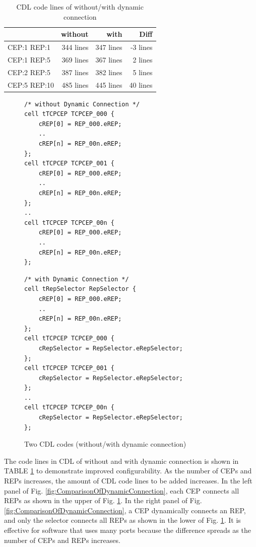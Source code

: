 \documentclass[conference]{IEEEtran/IEEEtran}
\begin{document}
\begin{table}[t]
    \centering
    \vspace{-1mm} \caption{CDL code lines of without/with dynamic connection}
    \begin{tabular}{l|r|r|r}
        \hline\hline
                     &  without  &  with  &  Diff  \\ \hline
        CEP:1 REP:1  &  344 lines     &  347 lines  &  -3 lines   \\
        CEP:1 REP:5  &  369 lines     &  367 lines  &   2 lines   \\
        CEP:2 REP:5  &  387 lines     &  382 lines  &   5 lines   \\
        CEP:5 REP:10 &  485 lines     &  445 lines  &  40 lines   \\
        \hline
    \end{tabular}
    \label{tab:EvaluationOfConfigurabilityByDynamicConnection}
\end{table}

\begin{figure}[t]
 \centering
 \begin{lstlisting}
/* without Dynamic Connection */
cell tTCPCEP TCPCEP_000 {
    cREP[0] = REP_000.eREP;
    ..
    cREP[n] = REP_00n.eREP;
};
cell tTCPCEP TCPCEP_001 {
    cREP[0] = REP_000.eREP;
    ..
    cREP[n] = REP_00n.eREP;
};
..
cell tTCPCEP TCPCEP_00n {
    cREP[0] = REP_000.eREP;
    ..
    cREP[n] = REP_00n.eREP;
};
 \end{lstlisting}
 \centering
 \begin{lstlisting}
/* with Dynamic Connection */
cell tRepSelector RepSelector {
    cREP[0] = REP_000.eREP;
    ..
    cREP[n] = REP_00n.eREP;
};
cell tTCPCEP TCPCEP_000 {
    cRepSelector = RepSelector.eRepSelector;
};
cell tTCPCEP TCPCEP_001 {
    cRepSelector = RepSelector.eRepSelector;
};
..
cell tTCPCEP TCPCEP_00n {
    cRepSelector = RepSelector.eRepSelector;
};
 \end{lstlisting}
 \vspace{-1mm} \caption{Two CDL codes (without/with dynamic connection)}
 \vspace{-1mm} \label{src:ComparisonOfCDL}
\end{figure}

The code lines in CDL of without and with dynamic connection is shown in TABLE \ref{tab:EvaluationOfConfigurabilityByDynamicConnection} to demonstrate improved configurability.
As the number of CEPs and REPs increases, the amount of CDL code lines to be added increases.
In the left panel of Fig. \ref{fig:ComparisonOfDynamicConnection}, each CEP connects all REPs as shown in the upper of Fig. \ref{src:ComparisonOfCDL}. 
In the right panel of Fig. \ref{fig:ComparisonOfDynamicConnection}, a CEP dynamically connects an REP, and only the selector connects all REPs as shown in the lower of Fig. \ref{src:ComparisonOfCDL}. 
It is effective for software that uses many ports because the difference spreads as the number of CEPs and REPs increases.
\end{document}
